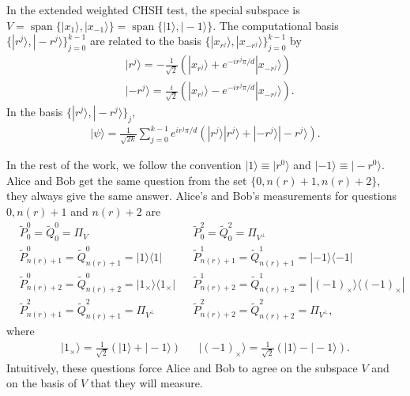 \documentclass[11pt,letterpaper]{article}
\newcommand{\ket}[1]{|#1\rangle}
\newcommand{\ketbra}[2]{|#1\rangle\langle#2|}
\DeclareMathOperator{\spn}{span}
\newcommand{\1}{\mathbb{1}}
\newcommand{\tP}{\tilde{P}}
\newcommand{\tQ}{\tilde{Q}}
\newcommand{\nr}{n(r)}
\theoremstyle{definition}
\begin{document}
In the extended weighted CHSH test, the special subspace is
$V = \spn\{ \ket{x_1}, \ket{x_{-1}}\} =
\spn\{\ket{1}, \ket{-1}\}$.
The computational basis $\{ \ket{r^j}, \ket{-r^j} \}_{j=0}^{k-1}$ are related to the basis
$
\{ \ket{x_{r^j}}, \ket{x_{-r^j}} \}_{j=0}^{k-1}
$
by
\begin{align*}
    &\ket{r^j} = -\frac{1}{\sqrt{2}}(\ket{x_{r^j}} + e^{-ir^j\pi/d}\ket{x_{-r^j}}) \\
    &\ket{-r^j} = \frac{i}{\sqrt{2}}(\ket{x_{r^j}} - e^{-ir^j\pi/d}\ket{x_{-r^j}}).
\end{align*}
In the basis $\{ \ket{r^j}, \ket{-r^j} \}_j$, 
\begin{align}
    \ket{\psi} = \frac{1}{\sqrt{2k}} \sum_{j=0}^{k-1}
    e^{ir^j\pi/d}(\ket{r^j}\ket{r^j} + \ket{-r^j}\ket{-r^j}).
\end{align}

In the rest of the work, we follow the 
convention $\ket{1} \equiv \ket{r^0}$
and $\ket{-1} \equiv \ket{-r^0}$.
Alice and Bob get the same question from the set $\{0,\nr+1,\nr+2\}$, they always give the same answer.
Alice's and Bob's measurements for questions $0, \nr+1$ and $\nr+2$ are
\begin{align*}
	&\tP_0^0 = \tQ_0^0 = \Pi_V && \tP_0^2 = \tQ_0^2 = \Pi_{V^\perp} \\
	&\tP_{\nr+1}^0 = \tQ_{\nr+1}^0 = \ketbra{1}{1} &&
	\tP_{\nr+1}^1 = \tQ_{\nr+1}^1 = \ketbra{-1}{-1} \\
	&\tP_{\nr+2}^0 = \tQ_{\nr+2}^0 = \ketbra{1_{\times}}{1_{\times}} && \tP_{\nr+2}^1 = \tQ_{\nr+2}^1 = \ketbra{(-1)_{\times}}{(-1)_{\times}} \\
	&\tP_{\nr+1}^2 = \tQ_{\nr+1}^2 = \Pi_{V^\perp} &&
	 \tP_{\nr+2}^2 = \tQ_{\nr+2}^2 = \Pi_{V^\perp},
\end{align*}
where
\begin{align*}
    \ket{1_{\times}} = \frac{1}{\sqrt{2}}(\ket{1} + \ket{-1})
	&&\ket{(-1)_{\times}} = \frac{1}{\sqrt{2}}(\ket{1} - \ket{-1}).
\end{align*}
Intuitively, these questions force Alice and Bob to agree on the subspace $V$ and
on the basis of $V$ that they will measure.
\end{document}
